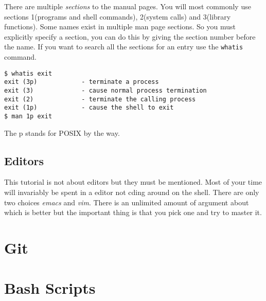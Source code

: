 \documentclass[10pt]{article}
\begin{document}
  There are multiple \textit{sections} to the manual pages. You will most commonly use sections 1(programs and shell commands), 2(system calls) and 3(library functions). Some names exist in multiple
  man page sections. So you must explicitly specify a section, you can do this by giving the section number before the name. If you want to search all the sections for an entry use the \texttt{whatis} command.

\begin{verbatim}
$ whatis exit
exit (3p)            - terminate a process
exit (3)             - cause normal process termination
exit (2)             - terminate the calling process
exit (1p)            - cause the shell to exit
$ man 1p exit
\end{verbatim}

  The p stands for POSIX by the way.



  
  \subsection{Editors}
  This tutorial is not about editors but they must be mentioned. Most of your time will invariably be spent in a editor not cding around on the shell. There are only two choices \textit{emacs} and \textit{vim}. There is an unlimited amount of argument about which is better but the important thing is that you pick one and try to master it.
  
\section{Git}

  
\section{Bash Scripts}





\end{document}
